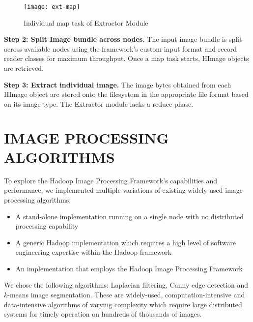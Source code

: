 \begin{figure}[h]
	\centering
	\texttt{[image: ext-map]}
	\caption{Individual map task of Extractor Module}
	\label{fig:ext-map}
\end{figure}

\textbf{Step 2: Split Image bundle across nodes.} The input image
bundle is split across available nodes using the framework's custom
input format and record reader classes for maximum throughput. Once a
map task starts, HImage objects are retrieved.

\textbf{Step 3: Extract individual image.} The image bytes obtained
from each HImage object are stored onto the filesystem in the
appropriate file format based on its image type.  The Extractor module
lacks a reduce phase.



\chapter{IMAGE PROCESSING ALGORITHMS}
\label{algorithms}
To explore the Hadoop Image Processing Framework's capabilities and
performance, we implemented multiple variations of existing
widely-used image processing algorithms:
\begin{itemize}
	\item A stand-alone implementation running on a single node with no
	distributed processing capability
	\item A generic Hadoop implementation which requires a high level of
	software engineering expertise within the Hadoop framework
	\item An implementation that employs the Hadoop Image Processing
	Framework
	\end{itemize}
	
	We chose the following algorithms: Laplacian filtering, Canny edge
	detection and $k$-means image segmentation.  These are widely-used,
	computation-intensive and data-intensive algorithms of varying complexity which
	require large distributed systems for timely operation on hundreds of
	thousands of images.
	
	
